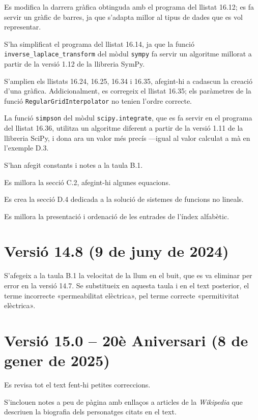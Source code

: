 Es modifica la darrera gràfica obtinguda amb el programa del llistat  16.12; es fa servir un gràfic de barres,  ja que  s'adapta millor al tipus de dades que es vol representar.

S'ha simplificat el programa del llistat 16.14, ja que la funció
\texttt{inverse\_laplace\_transform} del mòdul \texttt{sympy} fa servir un algoritme millorat a partir de la versió 1.12 de la llibreria SymPy.


S'amplien els llistats 16.24, 16.25, 16.34 i 16.35, afegint-hi a cadascun la creació d'una gràfica. Addicionalment, es corregeix el llistat 16.35; els paràmetres de la funció \texttt{RegularGridInterpolator} no tenien l'ordre correcte.


La funció \texttt{simpson} del mòdul \texttt{scipy.integrate}, que es fa servir en el programa del llistat 16.36, utilitza un algoritme diferent  a partir  de la versió 1.11 de la llibreria SciPy, i dona  ara un valor més precís ---igual al valor calculat a mà en l'exemple D.3.


S'han afegit constants i  notes a la taula B.1.

Es millora la secció C.2, afegint-hi algunes equacions.

Es crea la secció D.4 dedicada a la solució de sistemes de funcions  no lineals.

Es millora la presentació i ordenació de les entrades de l'índex alfabètic.


\section*{Versió 14.8 (9 de juny de 2024)}

S'afegeix a la taula B.1 la velocitat de la llum en el buit, que es va eliminar per error en la versió 14.7. Se substitueix en aquesta taula i en el text posterior, el terme incorrecte «permeabilitat elèctrica», pel terme correcte «permitivitat elèctrica».


\section*{Versió 15.0 -- 20è Aniversari (8 de gener de 2025)}

Es revisa tot el text fent-hi petites correccions.

S'inclouen notes a peu de pàgina  amb enllaços a articles de la \textit{Wikipedia} que descriuen la biografia dels personatges citats en el text.

